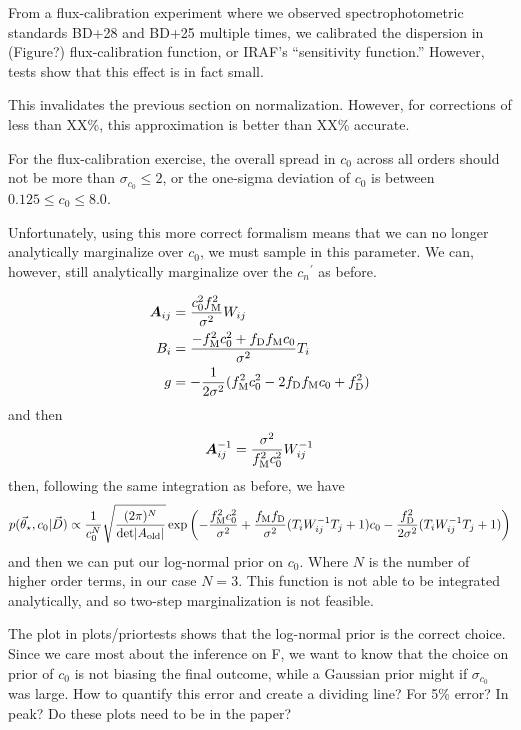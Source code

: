 \documentclass[preprint]{aastex} %
\newcommand{\vt}{\vec{\theta}}
\newcommand{\vstar}{\vt_{\star}}
\newcommand{\fM}{f_{\rm M}}
\newcommand{\fD}{f_{\rm D}}
\newcommand{\vD}{\vec{D}}
\begin{document}
From a flux-calibration experiment where we observed spectrophotometric standards BD+28 and BD+25 multiple times, we calibrated the dispersion in (Figure?) flux-calibration function, or IRAF's ``sensitivity function.''   However, tests show that this effect is in fact small.

This invalidates the previous section on normalization. However, for corrections of less than XX\%, this approximation is better than XX\% accurate.

For the flux-calibration exercise, the overall spread in $c_0$ across all orders should not be more than $\sigma_{c_0} \leq 2$, or the one-sigma deviation of $c_0$ is between $0.125 \leq c_0 \leq 8.0$.

Unfortunately, using this more correct formalism means that we can no longer analytically marginalize over $c_0$, we must sample in this parameter. We can, however, still analytically marginalize over the ${c_n}^\prime$ as before. 

\begin{align}
  {\bm A}_{ij} &= \frac{c_0^2 \fM^2}{\sigma^2} W_{ij}\\
  B_i &= \frac{-\fM^2 c_0^2 + \fD \fM c_0}{\sigma^2} T_i\\
  g & = -\frac{1}{2 \sigma^2} (\fM^2 c_0^2 - 2 \fD \fM c_0 + \fD^2)
\end{align}
and then 
\begin{equation}
  {\bm A}_{ij}^{-1} = \frac{\sigma^2}{\fM^2 c_0^2} W^{-1}_{ij}
\end{equation}
then, following the same integration as before, we have
\begin{equation}
  p(\vstar,c_0 | \vD) \propto \frac{1}{c_0^N} \sqrt{ \frac{(2 \pi)^N}{ {\rm det} |A_{\rm old}|}} \exp \left( -\frac{\fM^2 c_0^2}{\sigma^2} + \frac{\fM \fD}{\sigma^2} (T_i W^{-1}_{ij} T_j + 1 ) c_0 - \frac{\fD^2}{2 \sigma^2}  (T_i W^{-1}_{ij} T_j + 1 )\right)
\end{equation}
and then we can put our log-normal prior on $c_0$. Where $N$ is the number of higher order terms, in our case $N=3$. This function is not able to be integrated analytically, and so two-step marginalization is not feasible.


The plot in plots/priortests shows that the log-normal prior is the correct choice. Since we care most about the inference on F, we want to know that the choice on prior of $c_0$ is not biasing the final outcome, while a Gaussian prior might if $\sigma_{c_0}$ was large. How to quantify this error and create a dividing line? For 5\% error? In peak? Do these plots need to be in the paper?
 
\end{document}
